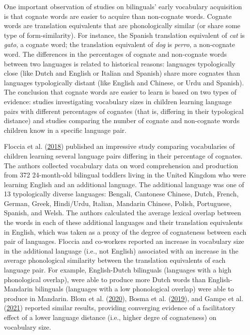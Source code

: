 \documentclass[
]{article}
\begin{document}
One important observation of studies on bilinguals' early vocabulary
acquisition is that cognate words are easier to acquire than non-cognate
words. Cognate words are translation equivalents that are phonologically
similar (or share some type of form-similarity). For instance, the
Spanish translation equivalent of \emph{cat} is \emph{gato}, a cognate
word; the translation equivalent of \emph{dog} is \emph{perro}, a
non-cognate word. The differences in the percentages of cognate and
non-cognate words between two languages is related to historical
reasons: languages typologically close (like Dutch and English or
Italian and Spanish) share more cognates than languages typologically
distant (like English and Chinese, or Urdu and Spanish). The conclusion
that cognate words are easier to learn is based on two types of
evidence: studies investigating vocabulary sizes in children learning
language pairs with different percentages of cognates (that is,
differing in their typological distance) and studies comparing the
number of cognate and non-cognate words children know in a specific
language pair.

Floccia et al. (\protect\hyperlink{ref-floccia2018introduction}{2018})
published an impressive study comparing vocabularies of children
learning several language pairs differing in their percentage of
cognates. The authors collected vocabulary data on word comprehension
and production from 372 24-month-old bilingual toddlers living in the
United Kingdom who were learning English and an additional language. The
additional language was one of 13 typologically diverse languages:
Bengali, Cantonese Chinese, Dutch, French, German, Greek, Hindi/Urdu,
Italian, Mandarin Chinese, Polish, Portuguese, Spanish, and Welsh. The
authors calculated the average lexical overlap between the words in each
of these additional languages and their translation equivalents in
English, which was taken as a proxy of the degree of cognateness between
each pair of languages. Floccia and co-workers reported an increase in
vocabulary size in the additional language (i.e., not English)
associated with an increase in the average phonological similarity
between the translation equivalents of each language pair. For example,
English-Dutch bilinguals (languages with a high phonological overlap),
were able to produce more Dutch words than English-Mandarin bilinguals
(languages with a low phonological overlap) were able to produce in
Mandarin. Blom et al.
(\protect\hyperlink{ref-blom2020crosslanguage}{2020}), Bosma et al.
(\protect\hyperlink{ref-bosma2019longitudinal}{2019}), and Gampe et al.
(\protect\hyperlink{ref-gampe2021does}{2021}) reported similar results,
providing converging evidence of a facilitatory effect of a lower
language distance (i.e., higher degre of cognateness) on vocabulary
size.
\end{document}
